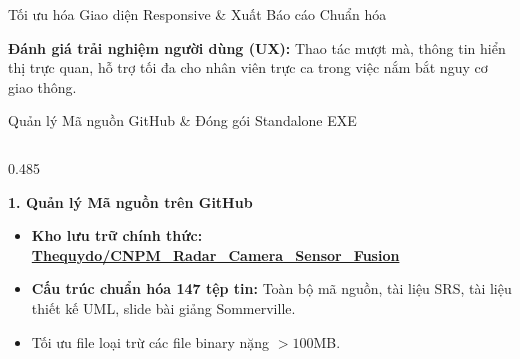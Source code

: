 \documentclass[aspectratio=169, 11pt]{beamer}
\newcommand{\code}[1]{\leavevmode{\ttfamily\color{DarkMain}#1}}
\begin{document}
\begin{frame}{Tối ưu hóa Giao diện Responsive \& Xuất Báo cáo Chuẩn hóa}
  \vspace{0.10cm}
  \centering
  \begin{tcolorbox}[
    enhanced, colback=DarkMain, colframe=white, boxrule=1.0pt, arc=3.5pt,
    top=3.5pt, bottom=3.5pt, left=8pt, right=8pt
  ]
    {\fontsize{7.4pt}{9.2pt}\selectfont\color{white}\textbf{Đánh giá trải nghiệm người dùng (UX):} Thao tác mượt mà, thông tin hiển thị trực quan, hỗ trợ tối đa cho nhân viên trực ca trong việc nắm bắt nguy cơ giao thông.}
  \end{tcolorbox}
\end{frame}

\begin{frame}{Quản lý Mã nguồn GitHub \& Đóng gói Standalone EXE}
  \vspace{-0.15cm}
  \begin{columns}[T, onlytextwidth]
    \begin{column}{0.485\textwidth}
      \begin{tcolorbox}[
        enhanced, colback=white, colframe=DarkMain, boxrule=0.9pt, arc=3.2pt,
        top=4pt, bottom=4pt, left=6pt, right=6pt
      ]
        {\fontsize{8.2pt}{9.8pt}\selectfont\bfseries\color{FacultyNavy} 1. Quản lý Mã nguồn trên GitHub}\\[3pt]
        {\fontsize{7.0pt}{8.8pt}\selectfont
        \begin{itemize}
          \item \textbf{Kho lưu trữ chính thức:}
          \newline\href{https://github.com/Thequydo/CNPM_Radar_Camera_Sensor_Fusion}{\color{FacultyNavy}\textbf{Thequydo/CNPM\_Radar\_Camera\_Sensor\_Fusion}}
          \item \textbf{Cấu trúc chuẩn hóa 147 tệp tin:} Toàn bộ mã nguồn, tài liệu SRS, tài liệu thiết kế UML, slide bài giảng Sommerville.
          \item Tối ưu file \code{.gitignore} loại trừ các file binary nặng $> 100$MB.
        \end{itemize}}
      \end{tcolorbox}
    \end{column}


\end{columns}
\end{frame}
\end{document}
